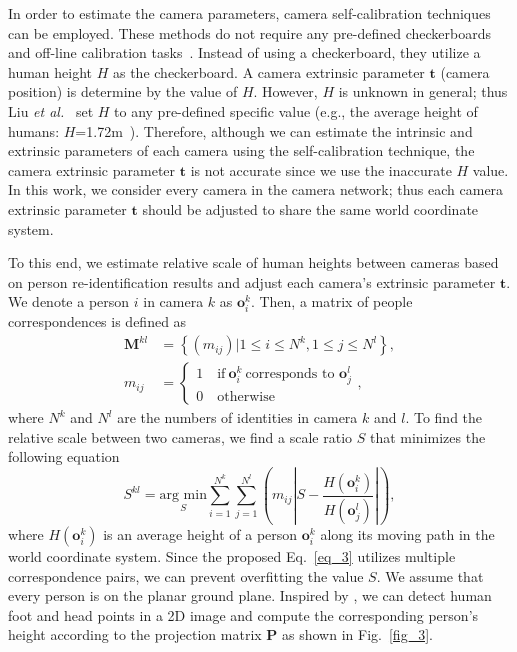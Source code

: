 \documentclass[10pt,twocolumn,letterpaper]{article}
\begin{document}
	In order to estimate the camera parameters, camera self-calibration techniques~\cite{liu2011surveillance, lv2006camera} can be employed. These methods do not require any pre-defined checkerboards and off-line calibration tasks~\cite{zhang1999flexible}. 
	Instead of using a checkerboard, they utilize a human height $H$ as the checkerboard.
	A camera extrinsic parameter $\mathbf{t}$ (camera position) is determine by the value of $H$.
	However, $H$ is unknown in general; thus Liu \textit{et al.}~\cite{liu2011surveillance} set $H$ to any pre-defined specific value (e.g., the average height of humans: $H$=1.72m~\cite{visscher2008sizing}). %
	Therefore, although we can estimate the intrinsic and extrinsic parameters of each camera using the self-calibration technique, the camera extrinsic parameter $\mathbf{t}$ is not accurate since we use the inaccurate $H$ value. 
	In this work, we consider every camera in the camera network; thus each camera extrinsic parameter $\mathbf{t}$ should be adjusted to share the same world coordinate system.
	
	To this end, we estimate relative scale of human heights between cameras based on person re-identification results and adjust each camera's extrinsic parameter $\mathbf{t}$.
	We denote a person $i$ in camera $k$ as $\mathbf{o}^k_i$. Then, a matrix of people correspondences is defined as
	\begin{equation}
	\begin{split}
	\mathbf{M}^{kl} & = \left\{ \left(m_{ij}\right) |  1 \le i \le N^k ,  1 \le j \le N^l  \right\}, \\
	m_{ij} & = \begin{cases} 1\quad \text{if}~ \mathbf{o}^k_i ~\text{corresponds to~}\mathbf{o}^l_j \\ 0\quad \text{otherwise} \end{cases},
	\end{split}
	\end{equation}
	where $N^k$ and $N^l$ are the numbers of identities in camera $k$ and $l$.
	To find the relative scale between two cameras, we find a scale ratio $S$ that minimizes the following equation
	\begin{equation}
	\label{eq_3}
	S^{kl} = \underset {  S  }{ \text{arg min} }\sum _{ i=1 }^{ N^k }{ \sum _{ j=1 }^{ N^l }{ \left(  m_{ij} \left| S - \frac { { H(\mathbf{o}^k_i) } }{ { H(\mathbf{o}^l_j) } }  \right| \right) }  }, 
	\end{equation}
	where $H(\mathbf{o}^k_i)$ is an average height of a person $\mathbf{o}^k_i$ along its moving path in the world coordinate system.
	Since the proposed Eq.~\eqref{eq_3} utilizes multiple correspondence pairs, we can prevent overfitting the value $S$.
	We assume that every person is on the planar ground plane. Inspired by \cite{lv2006camera}, we can detect human foot and head points in a 2D image and compute the corresponding person's height according to the projection matrix $\mathbf{P}$ as shown in Fig.~\ref{fig_3}.
	
\end{document}
